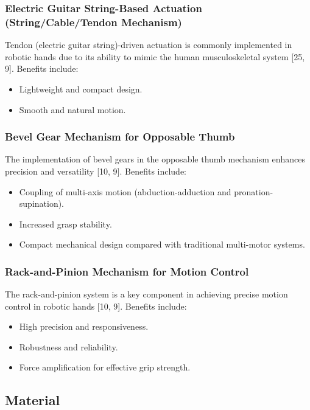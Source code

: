\subsubsection*{Electric Guitar String-Based Actuation (String/Cable/Tendon Mechanism)}

Tendon (electric guitar string)-driven actuation is commonly implemented in robotic hands due to its ability to mimic the human musculoskeletal system [25, 9]. Benefits include:
\begin{itemize}
    \item Lightweight and compact design.
    \item Smooth and natural motion.
\end{itemize}

\subsubsection*{Bevel Gear Mechanism for Opposable Thumb}

The implementation of bevel gears in the opposable thumb mechanism enhances precision and versatility [10, 9]. Benefits include:
\begin{itemize}
    \item Coupling of multi-axis motion (abduction-adduction and pronation-supination).
    \item Increased grasp stability.
    \item Compact mechanical design compared with traditional multi-motor systems.
\end{itemize}

\subsubsection*{Rack-and-Pinion Mechanism for Motion Control}

The rack-and-pinion system is a key component in achieving precise motion control in robotic hands [10, 9]. Benefits include:
\begin{itemize}
    \item High precision and responsiveness.
    \item Robustness and reliability.
    \item Force amplification for effective grip strength.
\end{itemize}

\subsection{Material}

